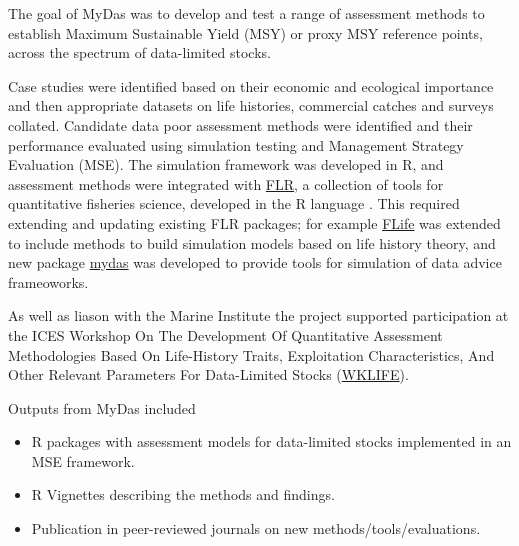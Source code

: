 The goal of MyDas was to develop and test a range of assessment methods to establish Maximum Sustainable Yield (MSY) or proxy MSY reference points, across the spectrum of data-limited stocks. 

Case studies were identified based on their economic and ecological importance and then appropriate  datasets on life histories, commercial catches and surveys collated. Candidate data poor assessment methods were identified and their performance evaluated using simulation testing and Management Strategy Evaluation (MSE). The simulation framework was developed in R, and assessment methods were integrated with \href{http://www.flr-project.org/}{FLR}, a collection of tools for quantitative fisheries science, developed in the R language \citep{kell2007flr}. This required extending and updating existing FLR packages; for example \href{https://github.com/flr/flife}{FLife} was extended to include methods to build simulation models based on life history theory, and new package \href{https://github.com/flr/mydas/wiki}{mydas} was developed to provide tools for simulation of data advice frameoworks.
 

As well as liason with the Marine Institute the project supported participation at the ICES Workshop On The Development Of Quantitative Assessment Methodologies Based On Life-History Traits, Exploitation Characteristics, And Other Relevant Parameters For Data-Limited Stocks (\href{https://www.ices.dk/community/groups/Pages/WKLIFEIX.aspx}{WKLIFE}).



Outputs from MyDas included

\begin{itemize}[noitemsep,topsep=0pt,parsep=0pt,partopsep=0pt]
 \item R packages with assessment models for data-limited stocks implemented in an MSE framework. 
 \item R Vignettes describing the methods and findings.
 \item Publication in peer-reviewed journals on new methods/tools/evaluations.
\end{itemize}


